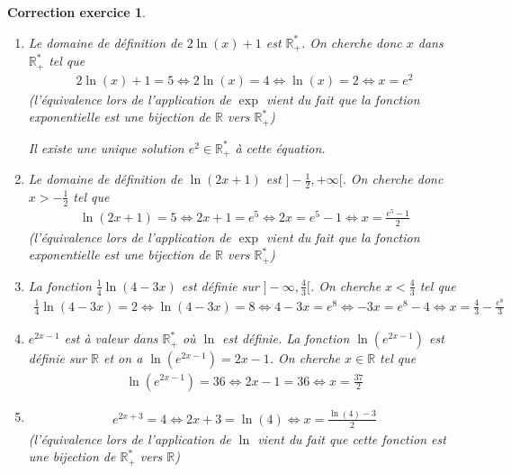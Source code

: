\documentclass[12pt]{article}
\newtheorem{correction}{\bf Correction exercice}
\newenvironment{cor}{
\begin{correction}\smallskip\normalfont}{\end{correction}
}
\newcommand*{\R}{\mathbb{R}}
\newif\ifcorrige\corrigetrue
\begin{document}
\ifcorrige
\color{magenta}
\begin{cor}
$\qquad$
\begin{enumerate}
\item Le domaine de d\'efinition de $2 \ln (x) + 1$ est $\R^*_+$.
  On cherche donc $x$ dans $\R_+^*$ tel que
  \begin{align*}
    2 \ln (x) + 1 = 5
    \iff
    2 \ln (x) = 4
    \iff
    \ln(x) = 2
    \iff
    x = e^{2}
  \end{align*}
  (l'\'equivalence lors de l'application de $\exp$ vient du fait que la fonction exponentielle
  est une bijection de $\R$ vers $\R_+^*$)

  Il existe une unique solution $e^2 \in \R_+^*$ \`a cette \'equation.

\item Le domaine de d\'efinition de $\ln(2x+1)$ est $]-\frac12 , + \infty[$.
  On cherche donc $x > -\frac12$ tel que
  \begin{align*}
    \ln(2x+1) = 5
    \iff
    2x+1 = e^5
    \iff
    2x = e^5 - 1
    \iff
    x = \frac{e^5 - 1}{2}
  \end{align*}
  (l'\'equivalence lors de l'application de $\exp$ vient du fait que la fonction exponentielle
  est une bijection de $\R$ vers $\R_+^*$)

\item La fonction $\frac14 \ln (4-3x)$ est d\'efinie sur $]-\infty , \frac43 [$.
  On cherche $x < \frac43$ tel que
  \begin{align*}
    \frac14 \ln (4-3x) = 2
    \iff
    \ln (4-3x) = 8
    \iff
    4 - 3x = e^8
    \iff
    -3x = e^8 - 4
    \iff
    x = \frac43 - \frac{e^8}{3}
  \end{align*}

\item $e^{2x-1}$ est \`a valeur dans $\R_+^*$ o\`u $\ln$ est d\'efinie.
  La fonction $\ln( e^{2x-1} )$ est d\'efinie sur $\R$ et on a $\ln( e^{2x-1} ) = 2x-1$.
  On cherche $x \in \R$ tel que
  \begin{align*}
    \ln( e^{2x-1} ) = 36
    \iff
    2x-1 = 36
    \iff
    x = \frac{37}2
  \end{align*}

\item
  \begin{align*}
    e^{2x+3} = 4
    \iff
    2x+3 = \ln(4)
    \iff
    x = \frac{\ln(4) - 3}{2}
  \end{align*}
  (l'\'equivalence lors de l'application de $\ln$ vient du fait que cette fonction
  est une bijection de $\R_+^*$ vers $\R$)


\end{enumerate}
\end{cor}
\end{document}
